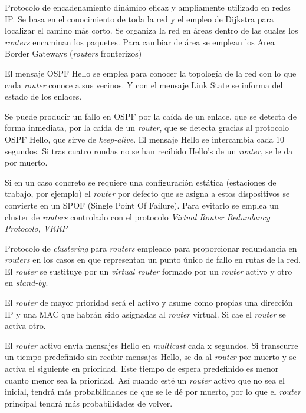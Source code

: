 \begin{defn}[OSPF]
Protocolo de encadenamiento dinámico eficaz y ampliamente utilizado en redes IP. Se basa en el conocimiento de toda la red y el empleo de Dijkstra para localizar el camino más corto. Se organiza la red en áreas dentro de las cuales los \textit{routers} encaminan los paquetes. Para cambiar de área se emplean los Area Border Gateways (\textit{routers} fronterizos)

El mensaje OSPF Hello se emplea para conocer la topología de la red con lo que cada \textit{router} conoce a sus vecinos. Y con el mensaje Link State se informa del estado de los enlaces.
\end{defn}

Se puede producir un fallo en OSPF por la caída de un enlace, que se detecta de forma inmediata, por la caída de un \textit{router}, que se detecta gracias al protocolo OSPF Hello, que sirve de \textit{keep-alive}. El mensaje Hello se intercambia cada 10 segundos. Si tras cuatro rondas no se han recibido Hello's de un \textit{router}, se le da por muerto.

Si en un caso concreto se requiere una configuración estática (estaciones de trabajo, por ejemplo) el \textit{router} por defecto que se asigna a estos dispositivos se convierte en un SPOF (Single Point Of Failure). Para evitarlo se emplea un cluster de \textit{routers} controlado con el protocolo \textit{Virtual Router Redundancy Protocolo, VRRP}

\begin{defn}[VRRP]
Protocolo de \textit{clustering} para \textit{routers} empleado para proporcionar redundancia en \textit{routers} en los casos en que representan un punto único de fallo en rutas de la red. El \textit{router} se sustituye por un \textit{virtual \textit{router}} formado por un \textit{router} activo y otro en \textit{stand-by}.

El \textit{router} de mayor prioridad será el activo y asume como propias una dirección IP y una MAC que habrán sido asignadas al \textit{router} virtual. Si cae el \textit{router} se activa otro.
\end{defn}

El \textit{router} activo envía mensajes Hello en \textit{multicast} cada x segundos. Si transcurre un tiempo predefinido sin recibir mensajes Hello, se da al \textit{router} por muerto y se activa el siguiente en prioridad. Este tiempo de espera predefinido es menor cuanto menor sea la prioridad. Así cuando esté un \textit{router} activo que no sea el inicial, tendrá más probabilidades de que se le dé por muerto, por lo que el \textit{router} principal tendrá más probabilidades de volver.

